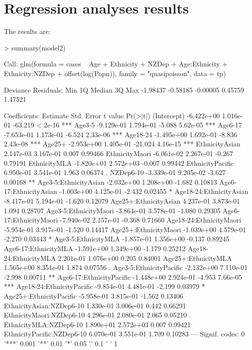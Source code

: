 \documentclass{article}
\begin{document}
\section{Regression analyses results}
\label{sub:regression_results}
The results are:

\begin{Schunk}
\begin{Sinput}
> summary(model2)
\end{Sinput}
\begin{Soutput}
Call:
glm(formula = cases ~ Age + Ethnicity + NZDep + Age:Ethnicity + 
    Ethnicity:NZDep + offset(log(Popn)), family = "quasipoisson", 
    data = tp)

Deviance Residuals: 
     Min        1Q    Median        3Q       Max  
-1.98437  -0.58185  -0.00005   0.45759   1.47521  

Coefficients:
                             Estimate Std. Error t value Pr(>|t|)    
(Intercept)                -6.422e+00  1.016e-01 -63.219  < 2e-16 ***
Age3-5                     -9.129e-01  1.794e-01  -5.088 5.62e-05 ***
Age6-17                    -7.653e-01  1.173e-01  -6.524 2.33e-06 ***
Age18-24                   -1.495e+00  1.692e-01  -8.836 2.43e-08 ***
Age25+                     -2.953e+00  1.405e-01 -21.024 4.16e-15 ***
EthnicityAsian              2.147e-03  3.167e-01   0.007  0.99466    
EthnicityMaori             -6.061e-02  2.267e-01  -0.267  0.79191    
EthnicityMLA               -1.820e+01  2.572e+03  -0.007  0.99442    
EthnicityPacific            6.950e-01  3.541e-01   1.963  0.06374 .  
NZDep6-10                  -3.339e-01  9.205e-02  -3.627  0.00168 ** 
Age3-5:EthnicityAsian      -2.032e+00  1.208e+00  -1.682  0.10813    
Age6-17:EthnicityAsian     -1.003e+00  4.125e-01  -2.432  0.02455 *  
Age18-24:EthnicityAsian    -8.417e-01  5.194e-01  -1.620  0.12079    
Age25+:EthnicityAsian       4.237e-01  3.873e-01   1.094  0.28707    
Age3-5:EthnicityMaori      -3.864e-01  3.578e-01  -1.080  0.29305    
Age6-17:EthnicityMaori     -7.940e-02  2.157e-01  -0.368  0.71660    
Age18-24:EthnicityMaori    -5.954e-01  3.917e-01  -1.520  0.14417    
Age25+:EthnicityMaori      -1.039e+00  4.579e-01  -2.270  0.03443 *  
Age3-5:EthnicityMLA        -1.857e-01  1.356e+00  -0.137  0.89245    
Age6-17:EthnicityMLA       -1.591e+00  1.349e+00  -1.179  0.25212    
Age18-24:EthnicityMLA       2.201e-01  1.076e+00   0.205  0.84001    
Age25+:EthnicityMLA         1.565e+00  8.351e-01   1.874  0.07556 .  
Age3-5:EthnicityPacific    -2.132e+00  7.110e-01  -2.998  0.00711 ** 
Age6-17:EthnicityPacific   -1.448e+00  2.924e-01  -4.953 7.66e-05 ***
Age18-24:EthnicityPacific  -9.854e-01  4.481e-01  -2.199  0.03979 *  
Age25+:EthnicityPacific    -5.958e-01  3.815e-01  -1.562  0.13406    
EthnicityAsian:NZDep6-10    1.330e-01  3.006e-01   0.442  0.66291    
EthnicityMaori:NZDep6-10    4.296e-01  2.080e-01   2.065  0.05210 .  
EthnicityMLA:NZDep6-10      1.890e+01  2.572e+03   0.007  0.99421    
EthnicityPacific:NZDep6-10  6.070e-01  3.551e-01   1.709  0.10283    
---
Signif. codes:  0 '***' 0.001 '**' 0.01 '*' 0.05 '.' 0.1 ' ' 1


\end{Soutput}
\end{Schunk}
\end{document}
